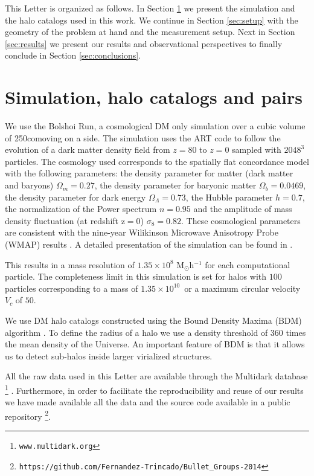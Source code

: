 \documentclass{emulateapj}
\newcommand{\hMpc}{{\ifmmode{h^{-1}{\rm Mpc}}\else{$h^{-1}$Mpc }\fi}}
\newcommand{\hMsun}{{\ifmmode{h^{-1}{\rm {M_{\odot}}}}\else{$h^{-1}{\rm{M_{\odot}}}$}\fi}}
\newcommand{\kms}{{\ifmmode{{\mathrm{\,km\ s}^{-1}}}\else{\,km~s$^{-1}$}\fi}}
\begin{document}
This Letter is organized as follows. In Section
\ref{sec:simulation} we present the simulation and the halo catalogs
used in this work. We continue in Section \ref{sec:setup} with the
geometry of the problem at hand and the measurement setup. Next in
Section \ref{sec:results} we present our results and observational
perspectives to finally conclude in Section \ref{sec:conclusions}. 

\section{Simulation, halo catalogs and pairs}
\label{sec:simulation}

We use the Bolshoi Run, a cosmological DM only simulation over a cubic
volume of 250\hMpc comoving on a side. The simulation uses the ART
code \citep{Kravtsov1997} to follow the evolution of a dark matter
density field from $z=80$ to $z=0$ sampled with $2048^3$  particles. The
cosmology used  corresponds to  the spatially flat concordance model
with the following parameters:  the density parameter for matter (dark
matter and baryons) $\Omega_m=0.27$, the density parameter for baryonic matter
$\Omega_b=0.0469$, the density parameter for dark energy
$\Omega_{\Lambda}=0.73$, the Hubble parameter $h=0.7$, the
normalization of the Power spectrum $n=0.95$ and the amplitude of mass
density fluctuation (at redshift z$=$0) $\sigma_8=0.82$.  These
cosmological parameters are consistent with the nine-year Wilikinson
Microwave Anisotropy Probe (WMAP) results \citep{hinshaw_etal13}. A
detailed presentation of the simulation can be found in \citet{2011ApJ...740..102K}.     

This results in a mass resolution of $1.35 \times 10^8$
M$_{\odot}$h$^{-1}$ for each computational particle. The completeness
limit in this simulation is set for halos with $100$ particles
corresponding to a mass of $1.35\times10^{10}$\hMsun\ or a maximum
circular velocity $V_{c}$ of $50$\kms. 

We use DM halo catalogs constructed using the Bound Density Maxima (BDM)
algorithm \citep{BDM,BDMb}. To define the radius of a halo we use a
density threshold of 360 times the mean density of the Universe. An
important feature of BDM is that it allows us to detect sub-halos
inside larger virialized structures.     

All the raw data used in this Letter are available through the Multidark database \footnote{\texttt{www.multidark.org}}
\citep{Riebe2013}.  Furthermore, in order to facilitate the
reproducibility and reuse of our results we have made available all
the data and the source code available in a public
repository \footnote{\texttt{https://github.com/Fernandez-Trincado/Bullet\_Groups-2014}}.
\end{document}
